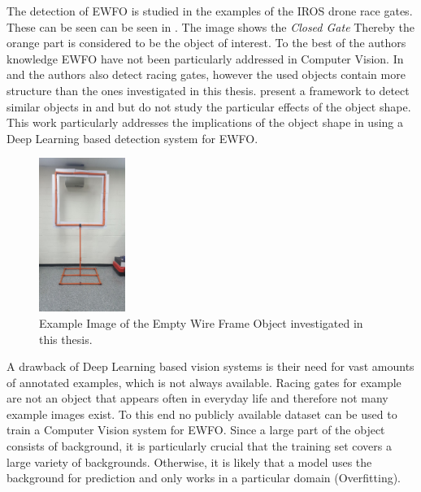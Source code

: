 The detection of \ac{EWFO} is studied in the examples of the \ac{IROS} drone race gates. These can be seen can be seen in . The image shows the \textit{Closed Gate} Thereby the orange part is considered to be the object of interest. To the best of the authors knowledge \ac{EWFO} have not been particularly addressed in Computer Vision. In \cite{Falanga} and \cite{Li2018a} the authors also detect racing gates, however the used objects contain more structure than the ones investigated in this thesis. \citeauthor{Jung2018} present a framework to detect similar objects in \cite{Jung} and \cite{Jung2018} but do not study the particular effects of the object shape. This work particularly addresses the implications of the object shape in using a Deep Learning based detection system for \ac{EWFO}.

\begin{figure}[bhtp]
	\centering
	\begin{minipage}{0.45\linewidth}
		\centering
		\includegraphics[height=5cm]{fig/closed_real}
	\end{minipage}\hfill
	\caption{Example Image of the Empty Wire Frame Object investigated in this thesis. }
	\label{fig:gates}
\end{figure}

A drawback of Deep Learning based vision systems is their need for vast amounts of annotated examples, which is not always available. Racing gates for example are not an object that appears often in everyday life and therefore not many example images exist. To this end no publicly available dataset can be used to train a Computer Vision system for \ac{EWFO}. Since a large part of the object consists of background, it is particularly crucial that the training set covers a large variety of backgrounds. Otherwise, it is likely that a model uses the background for prediction and only works in a particular domain (Overfitting). 

